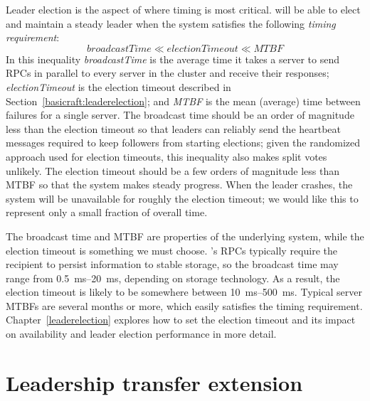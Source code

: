 Leader election is the aspect of \name{} where timing is most
critical. \name{} will be able to elect and maintain a steady
leader when the system satisfies the following
\emph{timing requirement}:
\begin{equation*}
\mathit{broadcastTime} \ll \mathit{electionTimeout} \ll \mathit{MTBF}
\end{equation*}
In this inequality \emph{broadcastTime} is the average time it takes a
server to send RPCs in parallel to every server in the cluster and receive
their responses; \emph{electionTimeout} is the election timeout described
in Section~\ref{basicraft:leaderelection}; and \emph{MTBF} is the
mean (average) time between failures for a
single server. The broadcast time should be an order of magnitude less than the
election timeout so that leaders can reliably send the heartbeat messages
required to keep followers from starting elections; given the randomized
approach used for election timeouts, this inequality also makes split votes
unlikely. 
The election timeout should be a few orders of magnitude less than MTBF
so that the system
makes steady progress. When the leader crashes, the system will be
unavailable for roughly the election timeout; we would like this to
represent only a small fraction of overall time.

The broadcast time and MTBF are properties of the underlying system, while
the election timeout is something we must choose. \name{}'s RPCs typically
require the recipient to persist information to stable storage, so the
broadcast time may range from \SIrange{0.5}{20}{\milli\second},
depending on storage
technology. As a result, the election
timeout is likely to be somewhere between
\SIrange{10}{500}{\milli\second}.
Typical server MTBFs are several months or more, which
easily satisfies the timing requirement.
Chapter~\ref{leaderelection} explores how to set the election timeout
and its impact on availability and leader election performance in more
detail.

\section{Leadership transfer extension}
\label{basicraft:leadershiptransfer}

